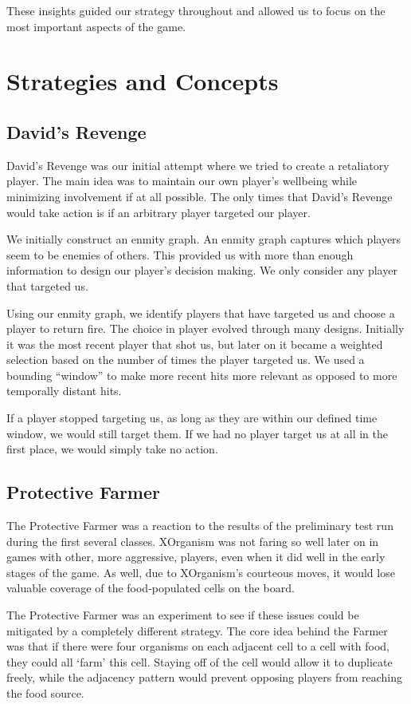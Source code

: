 \documentclass[
10pt, %
letterpaper, %
oneside, %
headinclude,footinclude, %
english
]{article}
\begin{document}
These insights guided our strategy throughout and allowed us to focus on the most important aspects of the game.

\section{Strategies and Concepts}

\subsection{David's Revenge}

David's Revenge was our initial attempt where we tried to create a retaliatory player. The main idea was to maintain our own player's wellbeing while minimizing involvement if at all possible. The only times that David's Revenge would take action is if an arbitrary player targeted our player.

We initially construct an enmity graph. An enmity graph captures which players seem to be enemies of others. This provided us with more than enough information to design our player's decision making. We only consider any player that targeted us.

Using our enmity graph, we identify players that have targeted us and choose a player to return fire. The choice in player evolved through many designs. Initially it was the most recent player that shot us, but later on it became a weighted selection based on the number of times the player targeted us. We used a bounding ``window'' to make more recent hits more relevant as opposed to more temporally distant hits.

If a player stopped targeting us, as long as they are within our defined time window, we would still target them. If we had no player target us at all in the first place, we would simply take no action.

\subsection{Protective Farmer}
The Protective Farmer was a reaction to the results of the preliminary test run during the first several classes. XOrganism was not faring so well later on in games with other, more aggressive, players, even when it did well in the early stages of the game. As well, due to XOrganism's courteous moves, it would lose valuable coverage of the food-populated cells on the board.

The Protective Farmer was an experiment to see if these issues could be mitigated by a completely different strategy. The core idea behind the Farmer was that if there were four organisms on each adjacent cell to a cell with food, they could all `farm' this cell. Staying off of the cell would allow it to duplicate freely, while the adjacency pattern would prevent opposing players from reaching the food source.
\end{document}
